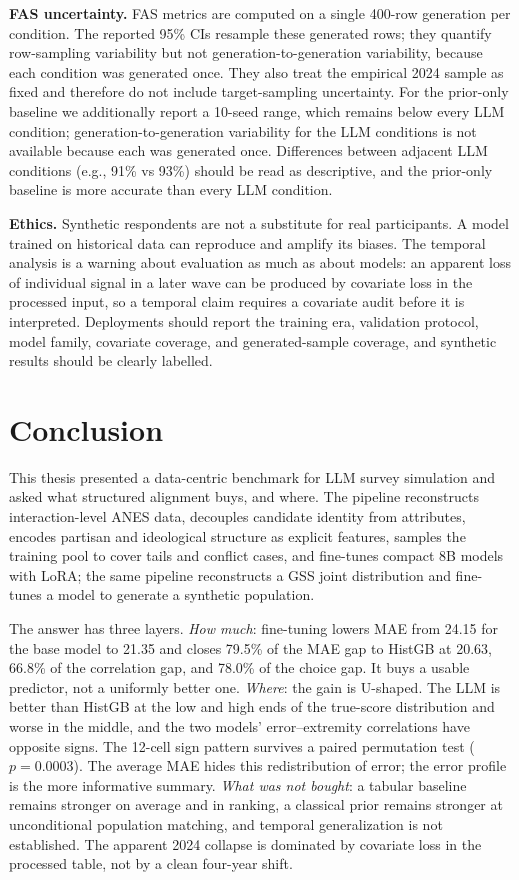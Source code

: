 \textbf{FAS uncertainty.} FAS metrics are computed on a single 400-row generation
per condition. The reported 95\% CIs resample these generated rows; they quantify
row-sampling variability but not generation-to-generation variability, because
each condition was generated once. They also treat the empirical 2024 sample as
fixed and therefore do not include target-sampling uncertainty. For the
prior-only baseline we additionally report a 10-seed range, which remains below
every LLM condition; generation-to-generation variability for the LLM conditions
is not available because each was generated once. Differences between adjacent
LLM conditions (e.g., 91\% vs 93\%) should be read as descriptive, and the
prior-only baseline is more accurate than every LLM condition.

\textbf{Ethics.} Synthetic respondents are not a substitute for real participants.
A model trained on historical data can reproduce and amplify its biases. The
temporal analysis is a warning about evaluation as much as about models: an
apparent loss of individual signal in a later wave can be produced by covariate
loss in the processed input, so a temporal claim requires a covariate audit
before it is interpreted. Deployments should report the training era, validation
protocol, model family, covariate coverage, and generated-sample coverage, and
synthetic results should be clearly labelled.

\section{Conclusion}

This thesis presented a data-centric benchmark for LLM survey simulation and
asked what structured alignment buys, and where. The pipeline reconstructs
interaction-level ANES data, decouples candidate identity from attributes,
encodes partisan and ideological structure as explicit features, samples the
training pool to cover tails and conflict cases, and fine-tunes compact 8B
models with LoRA; the same pipeline reconstructs a GSS joint distribution and
fine-tunes a model to generate a synthetic population.

The answer has three layers. \emph{How much}: fine-tuning lowers MAE from 24.15
for the base model to 21.35 and closes 79.5\% of the MAE gap to HistGB at 20.63,
66.8\% of the correlation gap, and 78.0\% of the choice gap. It buys a usable
predictor, not a uniformly better one. \emph{Where}: the gain is U-shaped. The
LLM is better than HistGB at the low and high ends of the true-score
distribution and worse in the middle, and the two models' error--extremity
correlations have opposite signs. The 12-cell sign pattern survives a paired
permutation test ($p=0.0003$). The average MAE hides this redistribution of
error; the error profile is the more informative summary. \emph{What was not
bought}: a tabular baseline remains stronger on average and in ranking, a
classical prior remains stronger at unconditional population matching, and
temporal generalization is not established. The apparent 2024 collapse is
dominated by covariate loss in the processed table, not by a clean four-year
shift.

